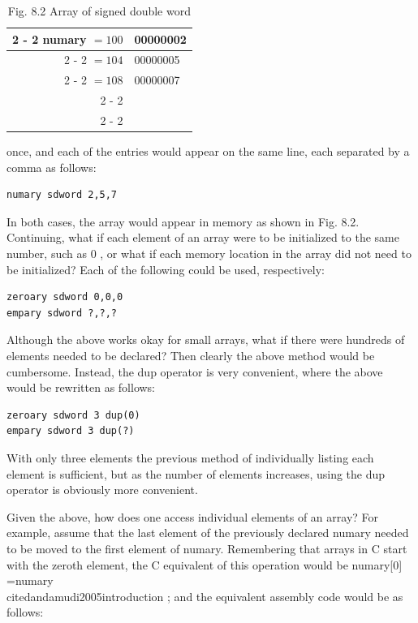\documentclass[10pt]{book}
\begin{document}
\begin{table}[htbp]
\begin{center}
\begin{tabular}{rl|}
\cline { 2 - 2 }
numary $=100$ & 00000002 \\
\cline { 2 - 2 }
$=104$ & 00000005 \\
\cline { 2 - 2 }
$=108$ & 00000007 \\
\cline { 2 - 2 }
 &  \\
\cline { 2 - 2 }
\end{tabular}
\captionsetup{labelformat=empty}
\caption{Fig. 8.2 Array of signed double word}
\end{center}
\end{table}


once, and each of the entries would appear on the same line, each separated by a comma as follows:

\begin{verbatim}
numary sdword 2,5,7
\end{verbatim}

In both cases, the array would appear in memory as shown in Fig. 8.2.\\
Continuing, what if each element of an array were to be initialized to the same number, such as 0 , or what if each memory location in the array did not need to be initialized? Each of the following could be used, respectively:

\begin{verbatim}
zeroary sdword 0,0,0
empary sdword ?,?,?
\end{verbatim}

Although the above works okay for small arrays, what if there were hundreds of elements needed to be declared? Then clearly the above method would be cumbersome. Instead, the dup operator is very convenient, where the above would be rewritten as follows:

\begin{verbatim}
zeroary sdword 3 dup(0)
empary sdword 3 dup(?)
\end{verbatim}

With only three elements the previous method of individually listing each element is sufficient, but as the number of elements increases, using the dup operator is obviously more convenient.

Given the above, how does one access individual elements of an array? For example, assume that the last element of the previously declared numary needed to be moved to the first element of numary. Remembering that arrays in C start with the zeroth element, the C equivalent of this operation would be numary[0] =numary \\cite{dandamudi2005introduction} ; and the equivalent assembly code would be as follows:
\end{document}
